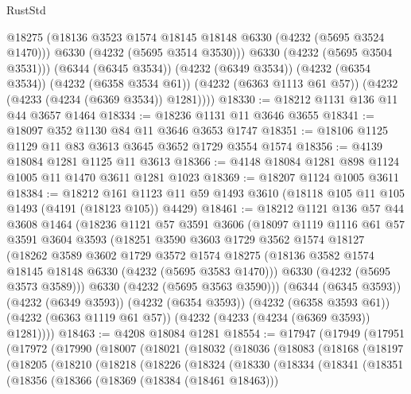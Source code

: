 \begin{lexlean}{RustStd}
\begin{coremodule}
            @18275
            (@18136 @3523 @1574 @18145 @18148 @6330 (@4232 (@5695 @3524 @1470)))
            @6330
            (@4232 (@5695 @3514 @3530)))
          @6330
          (@4232 (@5695 @3504 @3531)))
        (@6344 (@6345 @3534))
        (@4232 (@6349 @3534))
        (@4232 (@6354 @3534))
        (@4232 (@6358 @3534 @61))
        (@4232 (@6363 @1113 @61 @57))
        (@4232 (@4233 (@4234 (@6369 @3534)) @1281))))
@18330 := @18212 @1131 @136 @11 @44 @3657 @1464
@18334 := @18236 @1131 @11 @3646 @3655
@18341 := @18097 @352 @1130 @84 @11 @3646 @3653 @1747
@18351 := @18106 @1125 @1129 @11 @83 @3613 @3645 @3652 @1729 @3554 @1574
@18356 := @4139 @18084 @1281 @1125 @11 @3613
@18366 := @4148 @18084 @1281 @898 @1124 @1005 @11 @1470 @3611 @1281 @1023
@18369 := @18207 @1124 @1005 @3611
@18384 := @18212
    @161
    @1123
    @11
    @59
    @1493
    @3610
    (@18118 @105 @11 @105 @1493 (@4191 (@18123 @105)) @4429)
@18461 := @18212
    @1121
    @136
    @57
    @44
    @3608
    @1464
    (@18236
      @1121
      @57
      @3591
      @3606
      (@18097
        @1119
        @1116
        @61
        @57
        @3591
        @3604
        @3593
        (@18251
          @3590
          @3603
          @1729
          @3562
          @1574
          @18127
          (@18262
            @3589
            @3602
            @1729
            @3572
            @1574
            @18275
            (@18136 @3582 @1574 @18145 @18148 @6330 (@4232 (@5695 @3583 @1470)))
            @6330
            (@4232 (@5695 @3573 @3589)))
          @6330
          (@4232 (@5695 @3563 @3590)))
        (@6344 (@6345 @3593))
        (@4232 (@6349 @3593))
        (@4232 (@6354 @3593))
        (@4232 (@6358 @3593 @61))
        (@4232 (@6363 @1119 @61 @57))
        (@4232 (@4233 (@4234 (@6369 @3593)) @1281))))
@18463 := @4208 @18084 @1281
@18554 := @17947
    (@17949
      (@17951
        (@17972
          (@17990
            (@18007
              (@18021
                (@18032
                  (@18036
                    (@18083
                      (@18168
                        (@18197
                          (@18205
                            (@18210
                              (@18218
                                (@18226
                                  (@18324
                                    (@18330
                                      (@18334
                                        (@18341
                                          (@18351
                                            (@18356
                                              (@18366
                                                (@18369 (@18384 (@18461 @18463)))

\end{coremodule}
\end{lexlean}
